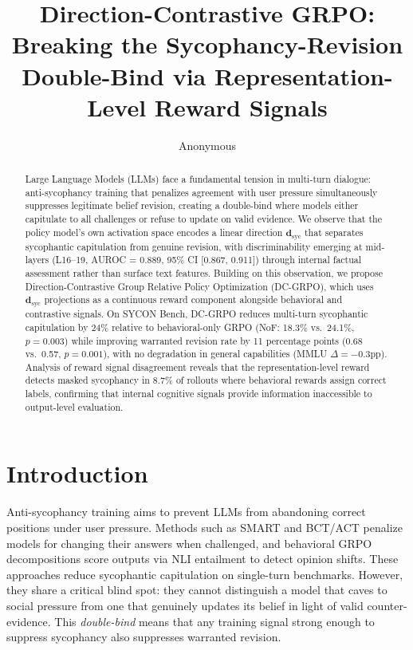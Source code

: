 \documentclass[11pt]{article}
\title{Direction-Contrastive GRPO: Breaking the Sycophancy-Revision\\Double-Bind via Representation-Level Reward Signals}
\author{Anonymous}
\date{}
\begin{document}
\maketitle

\begin{abstract}
Large Language Models (LLMs) face a fundamental tension in multi-turn dialogue: anti-sycophancy training that penalizes agreement with user pressure simultaneously suppresses legitimate belief revision, creating a double-bind where models either capitulate to all challenges or refuse to update on valid evidence.
We observe that the policy model's own activation space encodes a linear direction $\mathbf{d}_\text{syc}$ that separates sycophantic capitulation from genuine revision, with discriminability emerging at mid-layers (L16--19, AUROC = 0.889, 95\% CI [0.867, 0.911]) through internal factual assessment rather than surface text features.
Building on this observation, we propose Direction-Contrastive Group Relative Policy Optimization (DC-GRPO), which uses $\mathbf{d}_\text{syc}$ projections as a continuous reward component alongside behavioral and contrastive signals.
On SYCON Bench, DC-GRPO reduces multi-turn sycophantic capitulation by 24\% relative to behavioral-only GRPO (NoF: 18.3\% vs.\ 24.1\%, $p=0.003$) while improving warranted revision rate by 11 percentage points (0.68 vs.\ 0.57, $p=0.001$), with no degradation in general capabilities (MMLU $\Delta=-0.3$pp).
Analysis of reward signal disagreement reveals that the representation-level reward detects masked sycophancy in 8.7\% of rollouts where behavioral rewards assign correct labels, confirming that internal cognitive signals provide information inaccessible to output-level evaluation.
\end{abstract}

\section{Introduction}

Anti-sycophancy training aims to prevent LLMs from abandoning correct positions under user pressure. Methods such as SMART and BCT/ACT penalize models for changing their answers when challenged, and behavioral GRPO decompositions score outputs via NLI entailment to detect opinion shifts. These approaches reduce sycophantic capitulation on single-turn benchmarks. However, they share a critical blind spot: they cannot distinguish a model that caves to social pressure from one that genuinely updates its belief in light of valid counter-evidence. This \emph{double-bind} means that any training signal strong enough to suppress sycophancy also suppresses warranted revision.
\end{document}
